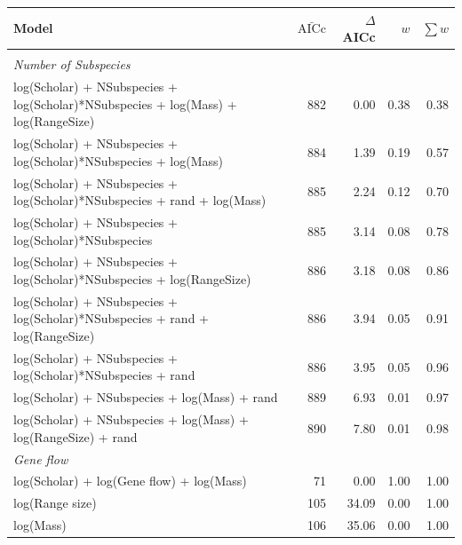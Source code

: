 \begin{landscape}
\begin{table}[t]
\begin{tabular}{@{}>{\footnotesize}lrrrr@{}}
\toprule
\normalsize{Model} & $\bar{\text{AICc}}$ & $\Delta$AICc & $w$ & $\sum w$\\
\midrule
&&&&\\[-3mm]
\textit{\small{Number of Subspecies}} &&&&\\
log(Scholar) + NSubspecies + log(Scholar)*NSubspecies  + log(Mass) + log(RangeSize) & 
882 & 0.00 &
0.38 & 0.38\\
log(Scholar) + NSubspecies + log(Scholar)*NSubspecies  + log(Mass) & 
884 & 1.39 &
0.19 & 0.57\\
log(Scholar) + NSubspecies + log(Scholar)*NSubspecies + rand + log(Mass) & 
885 & 2.24 &
0.12 & 0.70\\
log(Scholar) + NSubspecies + log(Scholar)*NSubspecies  & 
885 & 3.14 &
0.08 & 0.78\\
log(Scholar) + NSubspecies + log(Scholar)*NSubspecies  + log(RangeSize) & 
886 & 3.18 &
0.08 & 0.86\\
log(Scholar) + NSubspecies + log(Scholar)*NSubspecies  + rand + log(RangeSize) & 
886 & 3.94 &
0.05 & 0.91\\
log(Scholar) + NSubspecies + log(Scholar)*NSubspecies  + rand & 
886 & 3.95 &
0.05 & 0.96\\
log(Scholar) + NSubspecies + log(Mass) + rand & 
889 & 6.93 &
0.01 & 0.97\\
log(Scholar) + NSubspecies + log(Mass) + log(RangeSize) + rand& 
890 & 7.80 &
0.01 & 0.98\\[5mm]
\textit{\small{Gene flow}} &&&&\\
log(Scholar) + log(Gene flow) + log(Mass) & 
71 & 0.00 &
1.00 & 1.00\\
log(Range size) & 
105 & 34.09 &
0.00 & 1.00\\
log(Mass) & 
106 & 35.06 &
0.00 & 1.00\\
\bottomrule
\end{tabular}

\label{t:models}
\end{table}
\end{landscape}



